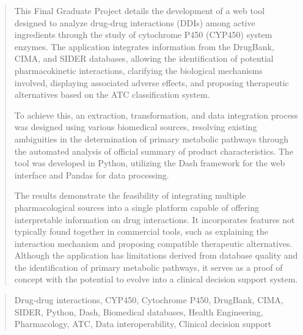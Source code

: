 \documentclass[a4paper,12pt,twoside]{memoir}
\begin{document}
\renewcommand*\abstractname{Abstract}
\begin{abstract}
This Final Graduate Project details the development of a web tool designed to analyze drug-drug interactions (DDIs) among active ingredients through the study of cytochrome P450 (CYP450) system enzymes. The application integrates information from the DrugBank, CIMA, and SIDER databases, allowing the identification of potential pharmacokinetic interactions, clarifying the biological mechanisms involved, displaying associated adverse effects, and proposing therapeutic alternatives based on the ATC classification system.

To achieve this, an extraction, transformation, and data integration process was designed using various biomedical sources, resolving existing ambiguities in the determination of primary metabolic pathways through the automated analysis of official summary of product characteristics. The tool was developed in Python, utilizing the Dash framework for the web interface and Pandas for data processing.

The results demonstrate the feasibility of integrating multiple pharmacological sources into a single platform capable of offering interpretable information on drug interactions. It incorporates features not typically found together in commercial tools, such as explaining the interaction mechanism and proposing compatible therapeutic alternatives. Although the application has limitations derived from database quality and the identification of primary metabolic pathways, it serves as a proof of concept with the potential to evolve into a clinical decision support system.
\end{abstract}

\renewcommand*\abstractname{Keywords}
\begin{abstract}
Drug-drug interactions, CYP450, Cytochrome P450, DrugBank, CIMA, SIDER, Python, Dash, Biomedical databases, Health Engineering, Pharmacology, ATC, Data interoperability, Clinical decision support
\end{abstract}

\clearpage

\tableofcontents

\clearpage

\listoffigures

\clearpage

\listoftables
\clearpage


\mainmatter












\end{document}
